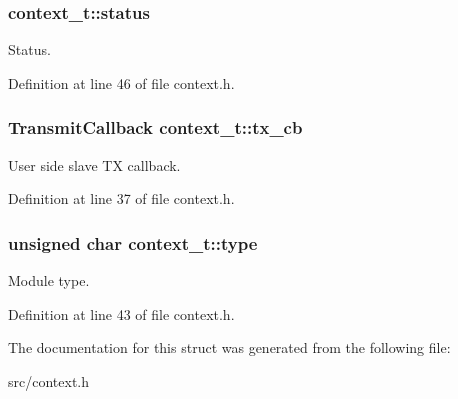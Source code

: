 \hypertarget{structcontext__t_a0e49b82a79be5df63399ddbcc0cc022c}{
\subsubsection[{status}]{ context\-\_\-t\-::status}}\label{structcontext__t_a0e49b82a79be5df63399ddbcc0cc022c}
Status. 

Definition at line 46 of file context.\-h.

\hypertarget{structcontext__t_a12db6f3e506312d989eb79877eae5e3b}{
\subsubsection[{tx\-\_\-cb}]{\setlength{\rightskip}{0pt plus 5cm}Transmit\-Callback context\-\_\-t\-::tx\-\_\-cb}}\label{structcontext__t_a12db6f3e506312d989eb79877eae5e3b}
User side slave T\-X callback. 

Definition at line 37 of file context.\-h.

\hypertarget{structcontext__t_a2dbb966924ef90bfba1876ad8a3872af}{
\subsubsection[{type}]{\setlength{\rightskip}{0pt plus 5cm}unsigned char context\-\_\-t\-::type}}\label{structcontext__t_a2dbb966924ef90bfba1876ad8a3872af}
Module type. 

Definition at line 43 of file context.\-h.



The documentation for this struct was generated from the following file\-:\begin{DoxyCompactItemize}
\item 
src/context.\-h\end{DoxyCompactItemize}
